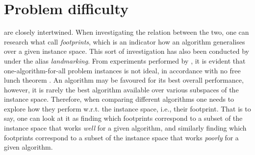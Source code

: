 
\chapter{Problem difficulty}\label{ch:defdifficulty} 


 are closely 
intertwined. When investigating the relation between the two, one can research 
what \citet{Corne10} call \emph{footprints}, which is an indicator how an 
algorithm generalises over a given instance space. This sort of investigation 
has also been conducted by \citet{Pfahringer00} under the alias 
\emph{landmarking}. 
From experiments performed by \citeauthor{Corne10}, it is evident that 
one-algorithm-for-all problem instances is not ideal, in accordance with no 
free lunch theorem \citep{Wolpert97nofree}. An algorithm may be favoured for 
its best overall performance, however, it is rarely the best algorithm 
available over various subspaces of the instance space.
Therefore, when comparing different algorithms one needs to explore how they perform w.r.t. the instance space, i.e., their footprint. That is to say, one can look at it as finding which footprints correspond to a subset of the instance space that works \emph{well} for a given algorithm, and similarly finding which footprints correspond to a subset of the instance space that works \emph{poorly} for a given algorithm. 

